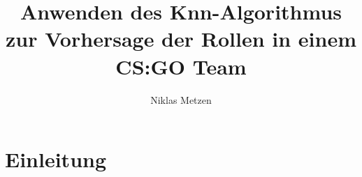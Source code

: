 \documentclass[envcountsame, envcountchap, deutsch]{i-studis}
\begin{document}
\setcounter{tocdepth}{4}
\setcounter{secnumdepth}{4}
\title{Anwenden des Knn-Algorithmus zur Vorhersage der Rollen in einem CS:GO Team}
\address{im Studiengang Wirtschaftsinformatik an der\\Hochschule Trier}

\author{Niklas Metzen}

\mytitlepage{}

\frontmatter
\tableofcontents					%
\listoffigures                        %
\listoftables                           %
\mainmatter{}


\chapter{Einleitung}
\end{document}
